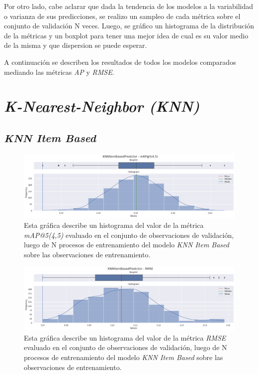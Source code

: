 \documentclass[11pt,a4paper,twoside]{thesis}
\begin{document}
Por otro lado, cabe aclarar que dada la tendencia de los modelos a la
variabilidad o varianza de sus predicciones, se realizo un sampleo de cada
métrica sobre el conjunto de validación N veces. Luego, se gráfico un
histograma de la distribución de la métricas y un boxplot para tener una mejor
idea de cual es su valor medio de la misma y que dispersion se puede esperar.

A continuación se describen los resultados de todos los modelos comparados
mediando las métricas \textit{AP\makeatletter@k} y \textit{RMSE}.

\section{\textit{K-Nearest-Neighbor (KNN)}}

\subsection{\textit{KNN Item Based}}

\begin{figure}[!htb]
	\centering
	\includegraphics[width=15cm]{./images/metrics-knn-item-based-mapk.png}
	\caption{Esta gráfica describe un histograma del valor de la métrica \textit{mAP@5(4,5)} evaluado en el conjunto de observaciones de validación, luego de N procesos de entrenamiento del modelo \textit{KNN Item Based} sobre las observaciones de entrenamiento.}
\end{figure}

\clearpage

\begin{figure}[!htb]
	\centering
	\includegraphics[width=15cm]{./images/metrics-knn-item-based-RMSE.png}
	\caption{Esta gráfica describe un histograma del valor de la métrica \textit{RMSE} evaluado en el conjunto de observaciones de validación, luego de N procesos de entrenamiento del modelo \textit{KNN Item Based} sobre las observaciones de entrenamiento.}
\end{figure}
\end{document}
